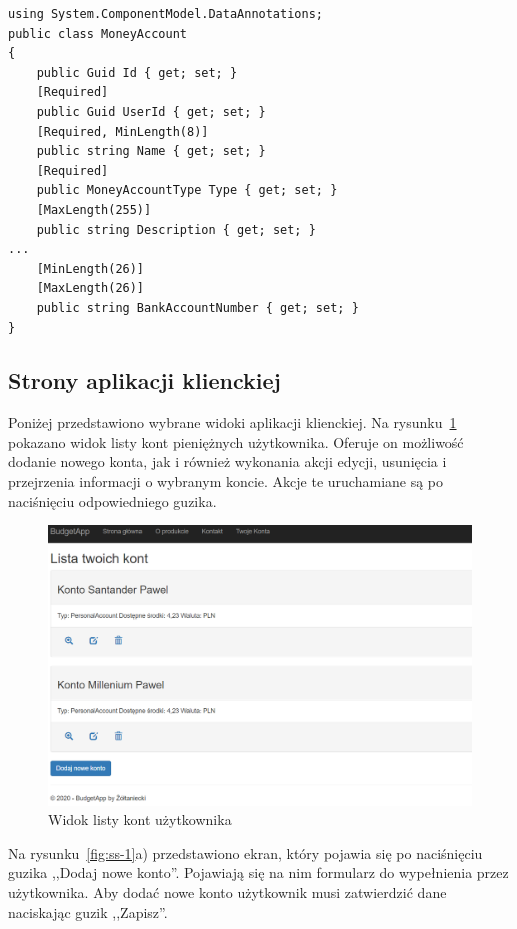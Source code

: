 {\belowcaptionskip=-10pt
\begin{lstlisting}[label=list:razor-validation-1,
    caption=Przykład klasy z adnotacjami]
using System.ComponentModel.DataAnnotations;
public class MoneyAccount
{
    public Guid Id { get; set; }
    [Required]
    public Guid UserId { get; set; }
    [Required, MinLength(8)]
    public string Name { get; set; }
    [Required]
    public MoneyAccountType Type { get; set; }
    [MaxLength(255)]
    public string Description { get; set; }
...
    [MinLength(26)]
    [MaxLength(26)]
    public string BankAccountNumber { get; set; }
}
\end{lstlisting}
}

\subsection{Strony aplikacji klienckiej}
\label{subsec:widok-client}
Poniżej przedstawiono wybrane widoki aplikacji klienckiej. Na rysunku~\ref{fig:ss-6} pokazano widok listy kont pieniężnych użytkownika. Oferuje on możliwość dodanie nowego konta, jak i również wykonania akcji edycji, usunięcia i przejrzenia informacji o wybranym koncie. Akcje te uruchamiane są po naciśnięciu odpowiedniego guzika.
\begin{figure}[ht]
	\centering
\includegraphics[scale=.38]{rys04/lista-kont.PNG}
	\caption{Widok listy kont użytkownika}
	\label{fig:ss-6}
\end{figure}

Na rysunku~\ref{fig:ss-1}a) przedstawiono ekran, który pojawia się po naciśnięciu guzika ,,Dodaj nowe konto''. Pojawiają się na nim formularz do wypełnienia przez użytkownika. Aby dodać nowe konto użytkownik musi zatwierdzić dane naciskając guzik ,,Zapisz''.

